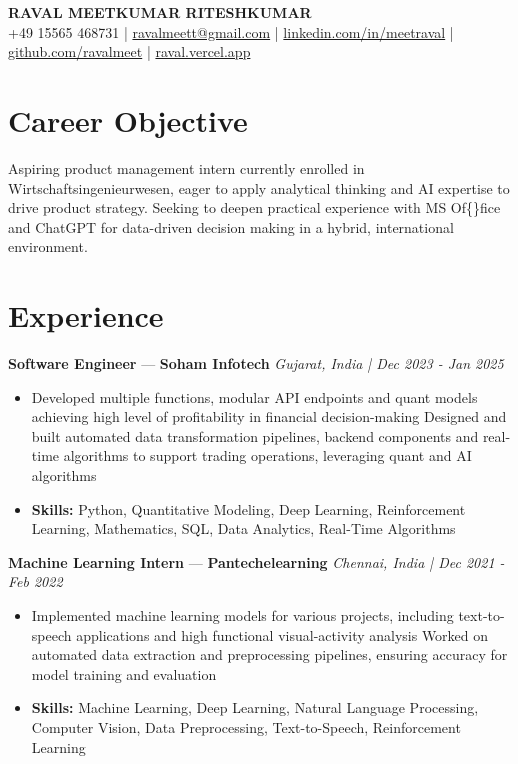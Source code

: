 \documentclass[a4paper,10pt]{article}
\begin{document}
\begin{center}
  {\Large\bfseries RAVAL MEETKUMAR RITESHKUMAR}\\[2pt]
  {\small +49 15565 468731 \;|\; \href{mailto:ravalmeett@gmail.com}{ravalmeett@gmail.com} \;|\; \href{https://www.linkedin.com/in/meetraval/}{linkedin.com/in/meetraval} \;|\; \href{https://github.com/ravalmeet}{github.com/ravalmeet} \;|\; \href{https://raval.vercel.app/}{raval.vercel.app}}
\end{center}
\vspace{-3pt}

\section*{Career Objective}
Aspiring product management intern currently enrolled in Wirtschaftsingenieurwesen, eager to apply analytical thinking and AI expertise to drive product strategy. Seeking to deepen practical experience with MS Of\{\}fice and ChatGPT for data-driven decision making in a hybrid, international environment.\par

\section*{Experience}
\textbf{Software Engineer} — \textbf{Soham Infotech} \hfill \textit{Gujarat, India \;|\; Dec 2023 - Jan 2025}\par
\vspace{1pt}
\begin{itemize}
  \item Developed multiple functions, modular API endpoints and quant models achieving high level of profitability in financial decision-making Designed and built automated data transformation pipelines, backend components and real-time algorithms to support trading operations, leveraging quant and AI algorithms
  \item \textbf{Skills:} Python, Quantitative Modeling, Deep Learning, Reinforcement Learning, Mathematics, SQL, Data Analytics, Real-Time Algorithms
\end{itemize}
\vspace{3pt}
\textbf{Machine Learning Intern} — \textbf{Pantechelearning} \hfill \textit{Chennai, India \;|\; Dec 2021 - Feb 2022}\par
\vspace{1pt}
\begin{itemize}
  \item Implemented machine learning models for various projects, including text-to-speech applications and high functional visual-activity analysis Worked on automated data extraction and preprocessing pipelines, ensuring accuracy for model training and evaluation
  \item \textbf{Skills:} Machine Learning, Deep Learning, Natural Language Processing, Computer Vision, Data Preprocessing, Text-to-Speech, Reinforcement Learning
\end{itemize}
\end{document}
